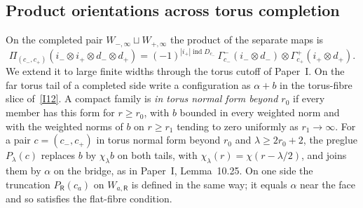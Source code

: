 \documentclass[11pt]{amsart}
\theoremstyle{definition}
\theoremstyle{remark}
\theoremstyle{plain}
\numberwithin{equation}{section}
\newcommand{\ind}{\operatorname{ind}}
\begin{document}
\subsection{Product orientations across torus completion}
\label{subsec:torus-split}
On the completed pair $W_{-,\infty}\sqcup W_{+,\infty}$ the product
of the separate maps is
\begin{equation}\label{eq:S-infty}
 \Pi_{(c_-,c_+)}(i_-\otimes i_+\otimes d_-\otimes d_+)
 =(-1)^{|i_+|\ind D_{c_-}}\,
   \Gamma^-_{c_-}(i_-\otimes d_-)\otimes\Gamma^+_{c_+}(i_+\otimes d_+).
\end{equation}
We extend it to large finite widths through the torus cutoff of
Paper~I. On the far torus tail of a completed side write a
configuration as $\alpha+b$ in the torus-fibre slice
of~\ref{I12}. A compact family is \emph{in torus normal form beyond
$r_0$} if every member has this form for $r\ge r_0$, with $b$ bounded
in every weighted norm and with the weighted norms of $b$ on $r\ge r_1$
tending to zero uniformly as $r_1\to\infty$. For a pair $c=(c_-,c_+)$
in torus normal form beyond $r_0$ and $\lambda\ge2r_0+2$, the preglue
$P_\lambda(c)$ replaces $b$ by $\chi_\lambda b$ on both tails, with
$\chi_\lambda(r)=\chi(r-\lambda/2)$, and joins them by $\alpha$ on the
bridge, as in Paper~I, Lemma~10.25. On one side the truncation
$P_{\mathsf R}(c_a)$ on $W_{a,\mathsf R}$ is defined in the same way; it
equals $\alpha$ near the face and so satisfies the flat-fibre
condition.
\end{document}
